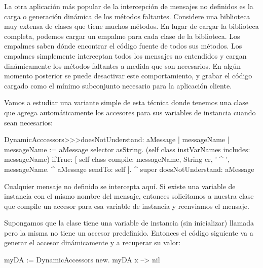 \documentclass[a4paper,10pt,twoside]{book}
\begin{document}
La otra aplicación más popular de la intercepción de mensajes no
definidos es la carga o generación dinámica de los métodos faltantes.
Considere una biblioteca muy extensa de clases que tiene muchos
métodos.  En lugar de cargar la biblioteca completa, podemos cargar un
empalme para cada clase de la biblioteca.  Los empalmes saben
dónde encontrar el código fuente de todos sus métodos.  Los
empalmes simplemente interceptan todos los mensajes no entendidos y cargan dinámicamente los métodos faltantes a medida que son necesarios.  En algún momento posterior se puede desactivar este comportamiento, y grabar el código cargado como el mínimo subconjunto necesario para la aplicación cliente.


Vamos a estudiar una variante simple de esta técnica donde tenemos una
clase que agrega automáticamente los accesores para sus variables de
instancia cuando sean necesarios:

\begin{code}{}
DynamicAcccessors>>>doesNotUnderstand: aMessage
        | messageName |
        messageName := aMessage selector asString.
        (self class instVarNames includes: messageName)
                ifTrue: [
                        self class compile: messageName, String cr, ' ^ ', messageName.
                        ^ aMessage sendTo: self ].
        ^ super doesNotUnderstand: aMessage
\end{code}
Cualquier mensaje no definido se intercepta aquí.  Si existe una
variable de instancia con el mismo nombre del mensaje, entonces
solicitamos a nuestra clase que compile un accesor para esa variable
de instancia y reenviamos el mensaje.

Supongamos que la clase  tiene una variable de
instancia (sin inicializar) llamada  pero la misma no tiene un
accesor predefinido.  Entonces el código siguiente va a generar el
accesor dinámicamente y a recuperar su valor:
\begin{code}{}
myDA := DynamicAccessors new.
myDA x --> nil
\end{code}
\end{document}
